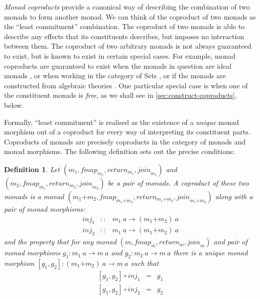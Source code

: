 \documentclass{jfp1}
\newtheorem{definition}{Definition}
\begin{document}
\newcommand{\cprd}[2]{#1\mathord{+}#2}

\emph{Monad coproducts} provide a canonical way of describing the
combination of two monads to form another monad. We can think of the
coproduct of two monads as the ``least commitment'' combination. The
coproduct of two monads is able to describe any effects that its
constituents describes, but imposes no interaction between them. The
coproduct of two arbitrary monads is not always guaranteed to exist,
but is known to exist in certain special cases. For example, monad
coproducts are guaranteed to exist when the monads in question are
ideal monads \cite{ghani04coproducts}, or when working in the category
of Sets \cite{adamek12coproducts}, or if the monads are constructed
from algebraic theories \cite{hyland06combining}. One particular
special case is when one of the constituent monads is \emph{free}, as
we shall see in \autoref{sec:construct-coproducts}, below.

Formally, ``least commitment'' is realised as the existence of a
\emph{unique} monad morphism out of a coproduct for every way of
interpreting its constituent parts. Coproducts of monads are precisely
coproducts in the category of monads and monad morphisms. The
following definition sets out the precise conditions:
\begin{definition}\label{defn:coproducts}
  Let $(m_1, \mathit{fmap}_{m_1}, \mathit{return}_{m_1}, \mathit{join}_{m_1})$ and $(m_2,
  \mathit{fmap}_{m_1}, \mathit{return}_{m_2}, \mathit{join}_{m_2})$ be a pair of monads. A \emph{coproduct} of these two monads is a
  monad $(\cprd{m_1}{m_2}, \mathit{fmap}_{\cprd{m_1}{m_2}}, \mathit{return}_{\cprd{m_1}{m_2}},
  \mathit{join}_{\cprd{m_1}{m_2}})$ along with a pair of monad morphisms:
  \begin{displaymath}
    \begin{array}{rcl}
      \mathit{inj}_1 & :: & m_1~a \to (\cprd{m_1}{m_2})~a \\
      \mathit{inj}_2 & :: & m_1~a \to (\cprd{m_1}{m_2})~a
    \end{array}
  \end{displaymath}
  and the property that for any monad $(m,\mathit{fmap}_m,
  \mathit{return}_m, \mathit{join}_m)$ and pair of monad morphisms
  $g_1 : m_1~a \to m~a$ and $g_2 : m_2~a \to m~a$ there is a
  \emph{unique} monad morphism $[g_1,g_2] : (\cprd{m_1}{m_2})~a \to
  m~a$ such that
  \begin{displaymath}
    \begin{array}{rcl}
      {}[g_1,g_2] \circ \mathit{inj}_1 & = & g_1 \\
      {}[g_1,g_2] \circ \mathit{inj}_2 & = & g_2
    \end{array}
  \end{displaymath}
\end{definition}
\end{document}
